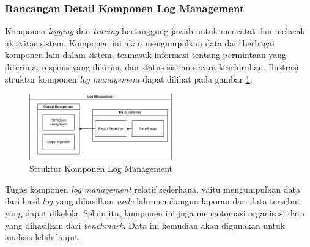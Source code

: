 \subsubsection{Rancangan Detail Komponen Log Management}
\label{subsubsection:detail-data-log-management}

Komponen \textit{logging} dan \textit{tracing} bertanggung jawab untuk mencatat dan melacak aktivitas sistem. Komponen ini akan mengumpulkan data dari berbagai komponen lain dalam sistem, termasuk informasi tentang permintaan yang diterima, respons yang dikirim, dan status sistem secara keseluruhan. Ilustrasi struktur komponen \textit{log management} dapat dilihat pada gambar \ref{fig:log-management-structure}.

\begin{figure}[ht]
    \centering
    \includegraphics[width=0.55\textwidth]{resources/chapter-3/log-management-architecture.png}
    \caption{Struktur Komponen Log Management}
    \label{fig:log-management-structure}
\end{figure}

Tugas komponen \textit{log management} relatif sederhana, yaitu mengumpulkan data dari hasil \textit{log} yang dihasilkan \textit{node} lalu membangun laporan dari data tersebut yang dapat dikelola. Selain itu, komponen ini juga mengotomasi organisasi data yang dihasilkan dari \textit{benchmark}. Data ini kemudian akan digunakan untuk analisis lebih lanjut.